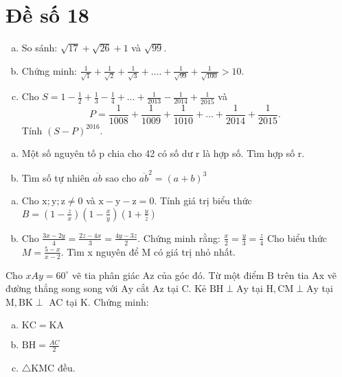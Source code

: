 \onehalfspacing
\section{Đề số 18}
\graphicspath{{./img/}}
\begin{bt} 
    \hfil
    \begin{enumerate}[a.]
        \item So sánh: $\sqrt{17}+\sqrt{26}+1$ và $\sqrt{99}$.
        \item Chứng minh: $\frac{1}{\sqrt{1}}+\frac{1}{\sqrt{2}}+\frac{1}{\sqrt{3}}+\ldots .+\frac{1}{\sqrt{99}}+\frac{1}{\sqrt{100}}>10$.
        \item Cho $S=1-\frac{1}{2}+\frac{1}{3}-\frac{1}{4}+\ldots+\frac{1}{2013}-\frac{1}{2014}+\frac{1}{2015}$ và
        $$
        P=\frac{1}{1008}+\frac{1}{1009}+\frac{1}{1010}+\ldots+\frac{1}{2014}+\frac{1}{2015} \text {. }
        $$
        Tính $(S-P)^{2016}$.
    \end{enumerate}
\loigiai{}
\end{bt}

\begin{bt}
    \hfill
	\begin{enumerate}[a.]
        \item Một số nguyên tố $\mathrm{p}$ chia cho 42 có số dư $\mathrm{r}$ là hợp số. Tìm hợp số $\mathrm{r}$.
        \item Tìm số tự nhiên $\overline{a b}$ sao cho $\overline{a b}^2=(a+b)^3$
    \end{enumerate}
	\loigiai{} 
\end{bt}

\begin{bt}
    \hfill
	\begin{enumerate}[a.]
        \item Cho $\mathrm{x} ; \mathrm{y} ; \mathrm{z} \neq 0$ và $\mathrm{x}-\mathrm{y}-\mathrm{z}=0$. Tính giá trị biểu thức $B=\left(1-\frac{z}{x}\right)\left(1-\frac{x}{y}\right)\left(1+\frac{y}{z}\right)$
        \item Cho $\frac{3 x-2 y}{4}=\frac{2 z-4 x}{3}=\frac{4 y-3 z}{2}$. Chứng minh rằng: $\frac{x}{2}=\frac{y}{3}=\frac{z}{4}$
         Cho biểu thức $M=\frac{5-x}{x-2}$. Tìm x nguyên để $\mathrm{M}$ có giá trị nhỏ nhất.
    \end{enumerate}
	\loigiai{}
\end{bt}

\begin{bt}
   Cho $x A y=60^{\circ}$ vẽ tia phân giác $\mathrm{Az}$ của góc đó. Từ một điểm $\mathrm{B}$ trên tia $\mathrm{Ax}$ vẽ đường thẳng song song với $\mathrm{Ay}$ cắt $\mathrm{Az}$ tại $\mathrm{C}$. Kẻ $\mathrm{BH} \perp \mathrm{Ay}$ tại $\mathrm{H}, \mathrm{CM} \perp \mathrm{Ay}$ tại $\mathrm{M}, \mathrm{BK} \perp$ AC tại K. Chứng minh:
    \begin{enumerate}[a.]
        \item $\mathrm{KC}=\mathrm{KA}$
        \item $\mathrm{BH}=\frac{A C}{2}$
        \item $\triangle \mathrm{KMC}$ đều.
    \end{enumerate}
\loigiai{}
\end{bt}

